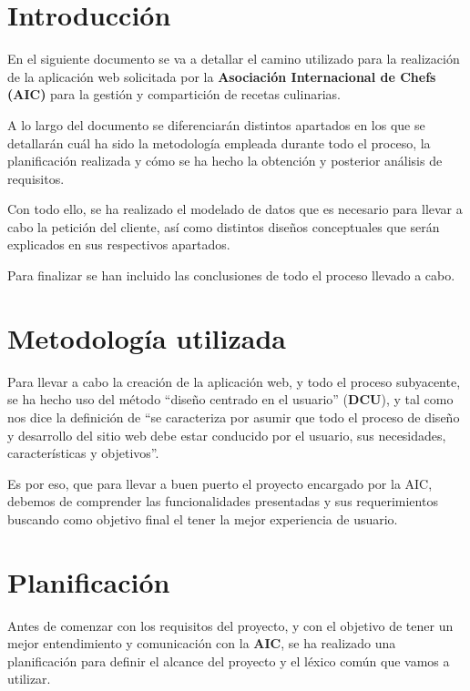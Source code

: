 \documentclass{\ClassPath/viu-tfm-template}
\begin{document}
    \graphicspath{{../VIU_TFM_LaTeX_template/}}

    \coverpage

    \tableofcontents

\chapter{Introducción}
En el siguiente documento se va a detallar el camino utilizado para la realización de la aplicación web solicitada por la  \textbf{Asociación Internacional de Chefs (AIC)} para la gestión y compartición de recetas culinarias.

A lo largo del documento se diferenciarán distintos apartados en los que se detallarán cuál ha sido la metodología empleada durante todo el proceso, la planificación realizada y cómo se ha hecho la obtención y posterior análisis de requisitos.

Con todo ello, se ha realizado el modelado de datos que es necesario para llevar a cabo la petición del cliente, así como distintos diseños conceptuales que serán explicados en sus respectivos apartados.

Para finalizar se han incluido las conclusiones de todo el proceso llevado a cabo.


\chapter{Metodología utilizada}
Para llevar a cabo la creación de la aplicación web, y todo el proceso subyacente, se ha hecho uso del método “diseño centrado en el usuario” (\textbf{DCU}), y tal como nos dice la definición de \textcite{hassan2004diseno} “se caracteriza por asumir que todo el proceso de diseño y desarrollo del sitio web debe estar conducido por el usuario, sus necesidades, características y objetivos”.

Es por eso, que para llevar a buen puerto el proyecto encargado por la AIC, debemos de comprender las funcionalidades presentadas y sus requerimientos buscando como objetivo final el tener la mejor experiencia de usuario.

\chapter{Planificación}
Antes de comenzar con los requisitos del proyecto, y con el objetivo de tener un mejor entendimiento y comunicación con la \textbf{AIC}, se ha realizado una planificación para definir el alcance del proyecto y el léxico común que vamos a utilizar.
\end{document}
